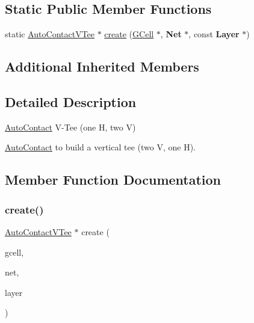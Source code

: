 \subsection*{Static Public Member Functions}
\begin{DoxyCompactItemize}
\item 
static \mbox{\hyperlink{classKatabatic_1_1AutoContactVTee}{Auto\+Contact\+V\+Tee}} $\ast$ \mbox{\hyperlink{classKatabatic_1_1AutoContactVTee_ab6932aef1faf4881375cc989f5cd9c2c}{create}} (\mbox{\hyperlink{classKatabatic_1_1GCell}{G\+Cell}} $\ast$, \textbf{ Net} $\ast$, const \textbf{ Layer} $\ast$)
\end{DoxyCompactItemize}
\subsection*{Additional Inherited Members}


\subsection{Detailed Description}
\mbox{\hyperlink{classKatabatic_1_1AutoContact}{Auto\+Contact}} V-\/\+Tee (one H, two V) 

\mbox{\hyperlink{classKatabatic_1_1AutoContact}{Auto\+Contact}} to build a vertical tee (two V, one H). 

\subsection{Member Function Documentation}
\mbox{\label{classKatabatic_1_1AutoContactVTee_ab6932aef1faf4881375cc989f5cd9c2c}} 
\subsubsection{\texorpdfstring{create()}{create()}}
{\footnotesize\ttfamily \mbox{\hyperlink{classKatabatic_1_1AutoContactVTee}{Auto\+Contact\+V\+Tee}} $\ast$ create (\begin{DoxyParamCaption}\item[{\mbox{\hyperlink{classKatabatic_1_1GCell}{G\+Cell}} $\ast$}]{gcell,  }\item[{\textbf{ Net} $\ast$}]{net,  }\item[{const \textbf{ Layer} $\ast$}]{layer }\end{DoxyParamCaption})\hspace{0.3cm}{\ttfamily [static]}}


